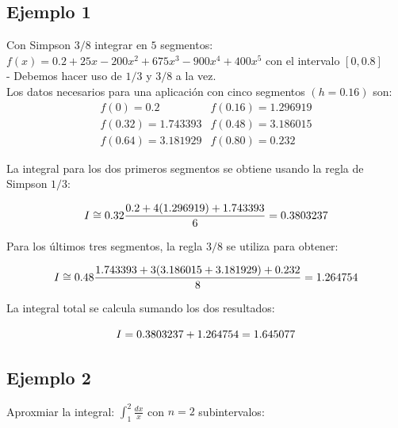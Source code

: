 \documentclass[journal,transmag]{IEEEtran}
\theoremstyle{mytheoremstyle}
\theoremstyle{mytheoremstyle}
\theoremstyle{myproblemstyle}
\begin{document}
        \subsection{Ejemplo 1}
            Con Simpson $3/8$ integrar en $5$ segmentos: \\

            $f(x) = 0.2 + 25x -200x^2 +675x^3 -900x^4 +400x^5$ con el intervalo $[0,0.8]$ \\

            - Debemos hacer uso de $1/3$ y $3/8$ a la vez. \\

            Los datos necesarios para una aplicación con cinco segmentos $(h = 0.16)$ son:
            \begin{align*}
                f(0) = 0.2         & f(0.16) = 1.296919 \\
                f(0.32) = 1.743393 & f(0.48) = 3.186015 \\
                f(0.64) = 3.181929 & f(0.80) = 0.232
            \end{align*}

            La integral para los dos primeros segmentos se obtiene usando la regla de Simpson $1/3$:

            \begin{equation} \notag
                I \cong 0.32 \frac{0.2 + 4(1.296919) + 1.743393}{6} = 0.3803237
            \end{equation}

            Para los últimos tres segmentos, la regla $3/8$ se utiliza para obtener:

            \begin{equation} \notag
                I \cong 0.48 \frac{1.743393 + 3(3.186015 + 3.181929) + 0.232}{8} = 1.264754
            \end{equation}

            La integral total se calcula sumando los dos resultados:

            \begin{equation} \notag
                I = 0.3803237 + 1.264754 = 1.645077
            \end{equation}

        \subsection{Ejemplo 2}

            Aproxmiar la integral: $\int_1^2 \frac{dx}{x}$ con $n = 2$ subintervalos: \\
\end{document}
